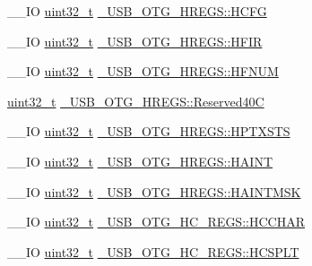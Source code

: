 \begin{DoxyCompactItemize}
\item 
\-\_\-\-\_\-\-I\-O \hyperlink{stdint_8h_a435d1572bf3f880d55459d9805097f62}{uint32\-\_\-t} \hyperlink{group___u_s_b___o_t_g___d_r_i_v_e_r_gac1e2d946a7649660bdb5b24442411b9a}{\-\_\-\-U\-S\-B\-\_\-\-O\-T\-G\-\_\-\-H\-R\-E\-G\-S\-::\-H\-C\-F\-G}
\item 
\-\_\-\-\_\-\-I\-O \hyperlink{stdint_8h_a435d1572bf3f880d55459d9805097f62}{uint32\-\_\-t} \hyperlink{group___u_s_b___o_t_g___d_r_i_v_e_r_gae044265829e203cac4abdfc133eb8467}{\-\_\-\-U\-S\-B\-\_\-\-O\-T\-G\-\_\-\-H\-R\-E\-G\-S\-::\-H\-F\-I\-R}
\item 
\-\_\-\-\_\-\-I\-O \hyperlink{stdint_8h_a435d1572bf3f880d55459d9805097f62}{uint32\-\_\-t} \hyperlink{group___u_s_b___o_t_g___d_r_i_v_e_r_gae4ad9b94bbef9b3687675e5b97ed31d7}{\-\_\-\-U\-S\-B\-\_\-\-O\-T\-G\-\_\-\-H\-R\-E\-G\-S\-::\-H\-F\-N\-U\-M}
\item 
\hyperlink{stdint_8h_a435d1572bf3f880d55459d9805097f62}{uint32\-\_\-t} \hyperlink{group___u_s_b___o_t_g___d_r_i_v_e_r_ga4ee95a63cf99de5521e87851064bbe02}{\-\_\-\-U\-S\-B\-\_\-\-O\-T\-G\-\_\-\-H\-R\-E\-G\-S\-::\-Reserved40\-C}
\item 
\-\_\-\-\_\-\-I\-O \hyperlink{stdint_8h_a435d1572bf3f880d55459d9805097f62}{uint32\-\_\-t} \hyperlink{group___u_s_b___o_t_g___d_r_i_v_e_r_ga652cf8d8c6553dc44901bdffa7d6c090}{\-\_\-\-U\-S\-B\-\_\-\-O\-T\-G\-\_\-\-H\-R\-E\-G\-S\-::\-H\-P\-T\-X\-S\-T\-S}
\item 
\-\_\-\-\_\-\-I\-O \hyperlink{stdint_8h_a435d1572bf3f880d55459d9805097f62}{uint32\-\_\-t} \hyperlink{group___u_s_b___o_t_g___d_r_i_v_e_r_gad9a8188233e5828e6e4f834ced7a0d1e}{\-\_\-\-U\-S\-B\-\_\-\-O\-T\-G\-\_\-\-H\-R\-E\-G\-S\-::\-H\-A\-I\-N\-T}
\item 
\-\_\-\-\_\-\-I\-O \hyperlink{stdint_8h_a435d1572bf3f880d55459d9805097f62}{uint32\-\_\-t} \hyperlink{group___u_s_b___o_t_g___d_r_i_v_e_r_gafa6f6d9cc7d7eec8c6ce03f807d0f89a}{\-\_\-\-U\-S\-B\-\_\-\-O\-T\-G\-\_\-\-H\-R\-E\-G\-S\-::\-H\-A\-I\-N\-T\-M\-S\-K}
\item 
\-\_\-\-\_\-\-I\-O \hyperlink{stdint_8h_a435d1572bf3f880d55459d9805097f62}{uint32\-\_\-t} \hyperlink{group___u_s_b___o_t_g___d_r_i_v_e_r_gac3ad21de95d63e9a2d419ccea2df38f4}{\-\_\-\-U\-S\-B\-\_\-\-O\-T\-G\-\_\-\-H\-C\-\_\-\-R\-E\-G\-S\-::\-H\-C\-C\-H\-A\-R}
\item 
\-\_\-\-\_\-\-I\-O \hyperlink{stdint_8h_a435d1572bf3f880d55459d9805097f62}{uint32\-\_\-t} \hyperlink{group___u_s_b___o_t_g___d_r_i_v_e_r_ga25824318899e3094e96b30151084a6c3}{\-\_\-\-U\-S\-B\-\_\-\-O\-T\-G\-\_\-\-H\-C\-\_\-\-R\-E\-G\-S\-::\-H\-C\-S\-P\-L\-T}

\end{DoxyCompactItemize}
